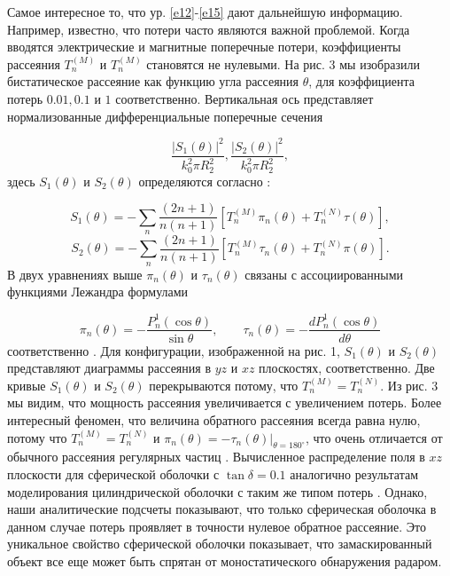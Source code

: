 \documentclass[a4paper, 12pt]{article}
\begin{document}
Самое интересное то, что ур. \eqref{e12}-\eqref{e15} дают дальнейшую информацию. 
Например, известно, что потери часто являются важной проблемой. Когда вводятся 
электрические и магнитные поперечные потери, коэффициенты рассеяния 
$T_n^{(M)}$ и $T_n^{(M)}$
становятся не нулевыми. На рис. 3 мы изобразили бистатическое рассеяние 
как функцию угла рассеяния $\theta$, для коэффициента потерь $0.01, 0.1$ и $1$ 
соответственно. Вертикальная ось представляет нормализованные дифференциальные 
поперечные сечения 

\begin{equation*}
\frac{|S_1(\theta)|^2}{k_0^2\pi R_2^2}, \frac{|S_2(\theta)|^2}{k_0^2\pi R_2^2},	
\end{equation*}
здесь $S_1(\theta)$ и $S_2(\theta)$ определяются согласно \cite{12}:

\begin{equation*}
S_1(\theta)=-\sum_n{\frac{(2n+1)}{n(n+1)}[T_n^{(M)}\pi_n(\theta)+T_n^{(N)}\tau(\theta)]},
\end{equation*}
\begin{equation}\label{e17}
S_2(\theta)=-\sum_n{\frac{(2n+1)}{n(n+1)}[T_n^{(M)}\tau_n(\theta)+T_n^{(N)}\pi(\theta)]}.
\end{equation}
В двух уравнениях выше $\pi_n(\theta)$ и $\tau_n(\theta)$ связаны с
ассоциированными функциями Лежандра формулами

\begin{equation*}
\pi_n(\theta)=-\frac{P_n^1(\cos\theta)}{\sin\theta}, \qquad 
\tau_n(\theta)=-\frac{dP_n^1(\cos\theta)}{d\theta} 	
\end{equation*} 
соответственно \cite{15}.
Для конфигурации, изображенной на рис. 1, $S_1(\theta)$ и $S_2(\theta)$
представляют диаграммы рассеяния в $yz$ и $xz$ плоскостях, соответственно.
Две кривые $S_1(\theta)$ и $S_2(\theta)$ перекрываются потому, что 
$T_n^{(M)}=T_n^{(N)}$. Из рис. 3 мы видим, что мощность рассеяния увеличивается
с увеличением потерь. Более интересный феномен, что величина обратного рассеяния
всегда равна нулю, потому что $T_n^{(M)}=T_n^{(N)}$ и $\pi_n(\theta)=-\tau_n(\theta
)|_{\theta=180^\circ}$, что очень отличается от обычного рассеяния регулярных 
частиц \cite{12}. Вычисленное распределение поля в $xz$ плоскости для сферической
оболочки с $\tan\delta=0.1$ аналогично результатам моделирования цилиндрической
оболочки с таким же типом потерь \cite{2}. Однако, наши аналитические подсчеты 
показывают, что только сферическая оболочка в данном случае потерь проявляет
в точности нулевое обратное рассеяние. Это уникальное свойство сферической оболочки
показывает, что замаскированный объект все еще может быть спрятан от 
моностатического обнаружения радаром.
\end{document}

